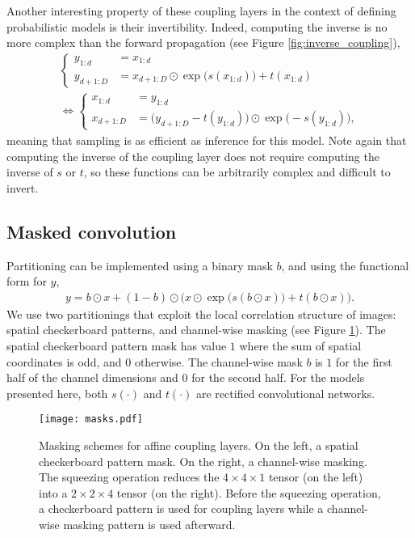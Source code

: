 \documentclass{article}
\begin{document}
Another interesting property of these coupling layers in the context of defining probabilistic models is their invertibility. Indeed, computing the inverse is no more complex than the forward propagation (see Figure \ref{fig:inverse_coupling}),
\begin{align}
\begin{cases}
y_{1:d} &= x_{1:d} \\
y_{d+1:D} &= x_{d+1:D} \odot \exp\big(s(x_{1:d})\big) + t(x_{1:d})
\end{cases}\\
\Leftrightarrow
\begin{cases}
x_{1:d} &= y_{1:d} \\
x_{d+1:D} &= \big(y_{d+1:D} - t(y_{1:d})\big) \odot \exp\big(-s(y_{1:d})\big),
\end{cases}
\end{align}
meaning that sampling is as efficient as inference for this model.
Note again that computing the inverse of the coupling layer does not require computing the inverse of $s$ or $t$, so these functions can be arbitrarily complex and difficult to invert.

\subsection{Masked convolution}
Partitioning can be implemented using a binary mask $b$, and using the functional form for $y$,
\begin{align}
y = b \odot x + (1 - b) \odot \Big(x \odot \exp\big(s(b \odot x)\big) + t(b \odot x)\Big)
.
\end{align}
We use two partitionings that exploit the local correlation structure of images: spatial checkerboard patterns, and channel-wise masking (see Figure \ref{fig:squeezing}). The spatial checkerboard pattern mask has value $1$ where the sum of spatial coordinates is odd, and $0$ otherwise. The channel-wise mask $b$ is $1$ for the first half of the channel dimensions and $0$ for the second half.
For the models presented here, both $s(\cdot)$ and $t(\cdot)$ are rectified convolutional networks.
\begin{figure}
\centering \texttt{[image: masks.pdf]}
\vspace{-10pt}
    \caption{Masking schemes for affine coupling layers. On the left, a spatial checkerboard pattern mask. On the right, a channel-wise masking. The squeezing operation reduces the $4 \times 4 \times 1$ tensor (on the left) into a $2 \times 2 \times 4$ tensor (on the right). Before the squeezing operation, a checkerboard pattern is used for coupling layers while a channel-wise masking pattern is used afterward. }
    \label{fig:squeezing}
\end{figure}
\end{document}
